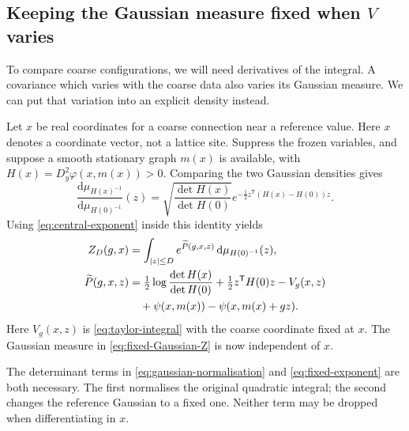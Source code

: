 \documentclass[11pt,reqno]{amsart}
\numberwithin{equation}{section}
\theoremstyle{definition}
\theoremstyle{remark}
\newcommand{\dd}{\mathrm d}
\begin{document}
\subsection{Keeping the Gaussian measure fixed when \(V\) varies}

To compare coarse configurations, we will need derivatives of the
integral. A covariance which varies with the coarse data also
varies its Gaussian measure. We can put that variation into an
explicit density instead.

Let \(x\) be real coordinates for a coarse connection near a
reference value. Here \(x\) denotes a coordinate vector, not a
lattice site. Suppress the frozen variables, and suppose a smooth
stationary graph \(m(x)\) is available, with
\(H(x)=D_y^2\varphi(x,m(x))>0\).
Comparing the two Gaussian densities gives
\begin{equation}
 \frac{\dd\mu_{H(x)^{-1}}}{\dd\mu_{H(0)^{-1}}}(z)
 =\sqrt{\frac{\det H(x)}{\det H(0)}}
        e^{-\frac12z^{\mathsf T}(H(x)-H(0))z}.
 \label{eq:fixed-gaussian-density}
\end{equation}
Using \eqref{eq:central-exponent} inside this identity yields
\begin{align}
 Z_D(g,x)&=\int_{|z|\le D}e^{\widetilde P(g,x,z)}
                                    \,\dd\mu_{H(0)^{-1}}(z),
                                    \label{eq:fixed-Gaussian-Z}\\
 \widetilde P(g,x,z)
   &=\tfrac12\log\frac{\det H(x)}{\det H(0)}
          +\tfrac12z^{\mathsf T}H(0)z-V_g(x,z)\notag\\
   &\quad+\psi(x,m(x))-\psi(x,m(x)+gz).
                                    \label{eq:fixed-exponent}
\end{align}
Here \(V_g(x,z)\) is \eqref{eq:taylor-integral} with the coarse
coordinate fixed at \(x\). The Gaussian measure in
\eqref{eq:fixed-Gaussian-Z} is now independent of \(x\).

The determinant terms in \eqref{eq:gaussian-normalisation} and
\eqref{eq:fixed-exponent} are both necessary. The first normalises
the original quadratic integral; the second changes the reference
Gaussian to a fixed one. Neither term may be dropped when
differentiating in \(x\).
\end{document}
